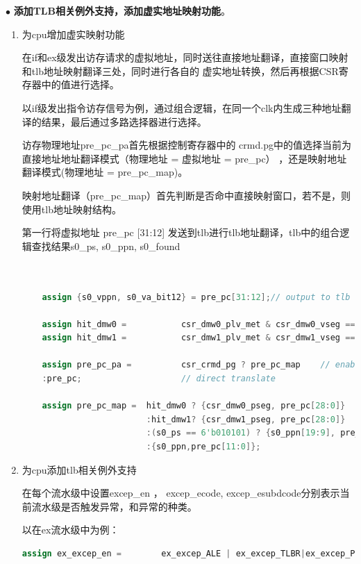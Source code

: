 \documentclass[11pt]{article}
\begin{document}
\noindent
$\bullet$
\textbf{添加TLB相关例外支持，添加虚实地址映射功能}。
\vspace{1ex}
\begin{enumerate}
  \item 为cpu增加虚实映射功能
  
  在if和ex级发出访存请求的虚拟地址，同时送往直接地址翻译，直接窗口映射和tlb地址映射翻译三处，同时进行各自的
  虚实地址转换，然后再根据CSR寄存器中的值进行选择。

  以if级发出指令访存信号为例，通过组合逻辑，在同一个clk内生成三种地址翻译的结果，最后通过多路选择器进行选择。

  访存物理地址pre\_pc\_pa首先根据控制寄存器中的 crmd.pg中的值选择当前为直接地址地址翻译模式（物理地址 = 虚拟地址 = pre\_pc）
  ，还是映射地址翻译模式(物理地址 = pre\_pc\_map)。

  映射地址翻译（pre\_pc\_map）首先判断是否命中直接映射窗口，若不是，则使用tlb地址映射结构。
  
  第一行将虚拟地址 pre\_pc [31:12] 发送到tlb进行tlb地址翻译，tlb中的组合逻辑查找结果s0\_ps, s0\_ppn, s0\_found
  
  \begin{lstlisting}[language=verilog]


    assign {s0_vppn, s0_va_bit12} = pre_pc[31:12];// output to tlb
                            
    assign hit_dmw0 =           csr_dmw0_plv_met & csr_dmw0_vseg == pre_pc[31:29];
    assign hit_dmw1 =           csr_dmw1_plv_met & csr_dmw1_vseg == pre_pc[31:29];

    assign pre_pc_pa =          csr_crmd_pg ? pre_pc_map    // enable mapping
    :pre_pc;                    // direct translate

    assign pre_pc_map =  hit_dmw0 ? {csr_dmw0_pseg, pre_pc[28:0]}         // dierct map windows 0
                         :hit_dmw1? {csr_dmw1_pseg, pre_pc[28:0]}         // direct map windows 1
                         :(s0_ps == 6'b010101) ? {s0_ppn[19:9], pre_pc[20:0]}   // tlb map: ps 4Mb
                         :{s0_ppn,pre_pc[11:0]};                             // tlb map : ps 4kb
  \end{lstlisting}
  
  \item 为cpu添加tlb相关例外支持
  
  在每个流水级中设置excep\_en ， excep\_ecode, excep\_esubdcode分别表示当前流水级是否触发异常，和异常的种类。

  以在ex流水级中为例：
\begin{lstlisting}[language=verilog]
  assign ex_excep_en =        ex_excep_ALE | ex_excep_TLBR|ex_excep_PIL| ex_excep_PIS| ex_excep_PPI|ex_excep_PME| id_excep_en;


\end{lstlisting}
\end{enumerate}
\end{document}
